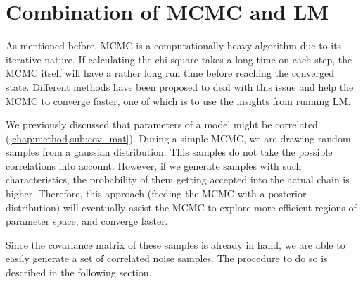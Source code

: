 \documentclass[12pt, TexShade, letterpaper]{report}
\begin{document}
\section{Combination of MCMC and LM}
As mentioned before, MCMC is a computationally heavy algorithm due to its iterative nature. If calculating the chi-square takes a long time on each step, the MCMC itself will have a rather long run time before reaching the converged state. Different methods have been proposed to deal with this issue and help the MCMC to converge faster, one of which is to use the insights from running LM.\par
We previously discussed that parameters of a model might be correlated (\ref{chap:method,sub:cov_mat}). During a simple MCMC, we are drawing random samples from a gaussian distribution. This samples do not take the possible correlations into account. However, if we generate samples with such characteristics, the probability of them getting accepted into the actual chain is higher. Therefore, this approach (feeding the MCMC with a posterior distribution) will eventually assist the MCMC to explore more efficient regions of parameter space, and converge faster.\par
Since the covariance matrix of these samples is already in hand, we are able to easily generate a set of correlated noise samples. The procedure to do so is described in the following section.\par
\end{document}

